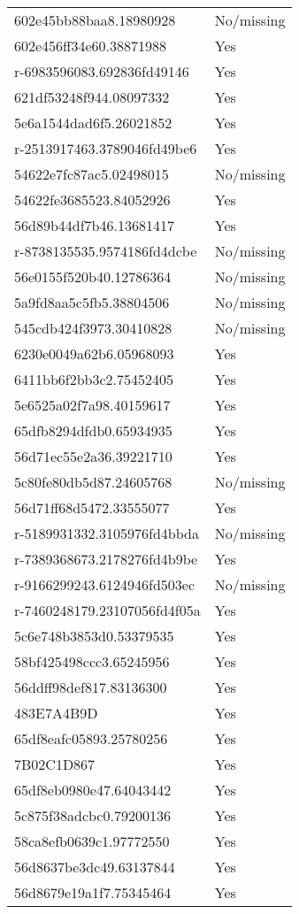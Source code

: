 \begin{tabular}{ll}
602e45bb88baa8.18980928 & No/missing \\
602e456ff34e60.38871988 & Yes \\
r-6983596083.692836fd49146 & Yes \\
621df53248f944.08097332 & Yes \\
5e6a1544dad6f5.26021852 & Yes \\
r-2513917463.3789046fd49be6 & Yes \\
54622e7fc87ac5.02498015 & No/missing \\
54622fe3685523.84052926 & Yes \\
56d89b44df7b46.13681417 & Yes \\
r-8738135535.9574186fd4dcbe & No/missing \\
56e0155f520b40.12786364 & No/missing \\
5a9fd8aa5c5fb5.38804506 & No/missing \\
545cdb424f3973.30410828 & No/missing \\
6230e0049a62b6.05968093 & Yes \\
6411bb6f2bb3c2.75452405 & Yes \\
5e6525a02f7a98.40159617 & Yes \\
65dfb8294dfdb0.65934935 & Yes \\
56d71ec55e2a36.39221710 & Yes \\
5c80fe80db5d87.24605768 & No/missing \\
56d71ff68d5472.33555077 & Yes \\
r-5189931332.3105976fd4bbda & No/missing \\
r-7389368673.2178276fd4b9be & Yes \\
r-9166299243.6124946fd503ec & No/missing \\
r-7460248179.23107056fd4f05a & Yes \\
5c6e748b3853d0.53379535 & Yes \\
58bf425498ccc3.65245956 & Yes \\
56ddff98def817.83136300 & Yes \\
483E7A4B9D & Yes \\
65df8eafc05893.25780256 & Yes \\
7B02C1D867 & Yes \\
65df8eb0980e47.64043442 & Yes \\
5c875f38adcbc0.79200136 & Yes \\
58ca8efb0639c1.97772550 & Yes \\
56d8637be3dc49.63137844 & Yes \\
56d8679e19a1f7.75345464 & Yes \\

\end{tabular}
